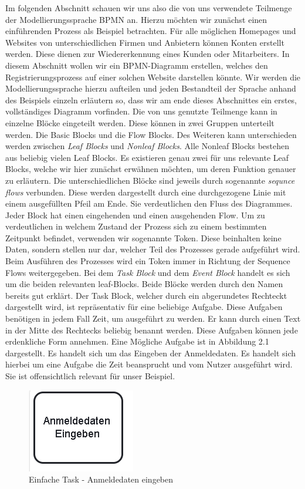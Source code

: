 Im folgenden Abschnitt schauen wir uns also die von uns verwendete Teilmenge der Modellierungssprache BPMN an. Hierzu möchten wir zunächst einen einführenden Prozess als Beispiel betrachten. Für alle möglichen Homepages und Websites von unterschiedlichen Firmen und Anbietern können Konten erstellt werden. Diese dienen zur Wiedererkennung eines Kunden oder Mitarbeiters. In diesem Abschnitt wollen wir ein BPMN-Diagramm erstellen, welches den Registrierungsprozess auf einer solchen Website darstellen könnte. Wir werden die Modellierungssprache hierzu aufteilen und jeden Bestandteil der Sprache anhand des Beispiels einzeln erläutern so, dass wir am ende dieses Abschnittes ein erstes, vollständiges Diagramm vorfinden. 
Die von uns genutzte Teilmenge kann in einzelne Blöcke eingeteilt werden. Diese können in zwei Gruppen unterteilt werden. Die Basic Blocks und die Flow Blocks. Des Weiteren kann unterschieden werden zwischen \emph{Leaf Blocks} und \emph{Nonleaf Blocks}. Alle Nonleaf Blocks bestehen aus beliebig vielen Leaf Blocks. Es existieren genau zwei für uns relevante Leaf Blocks, welche wir hier zunächst erwähnen möchten, um deren Funktion genauer zu erläutern. Die unterschiedlichen Blöcke sind jeweils durch sogenannte \emph{sequnce flows} verbunden. Diese werden dargestellt durch eine durchgezogene Linie mit einem ausgefüllten Pfeil am Ende. Sie verdeutlichen den Fluss des Diagrammes. Jeder Block hat einen eingehenden und einen ausgehenden Flow. Um zu verdeutlichen in welchem Zustand der Prozess sich zu einem bestimmten Zeitpunkt befindet, verwenden wir sogenannte Token. Diese beinhalten keine Daten, sondern stellen nur dar, welcher Teil des Prozesses gerade aufgeführt wird. Beim Ausführen des Prozesses wird ein Token immer in Richtung der Sequence Flows weitergegeben. Bei dem \emph{Task Block} und dem \emph{Event Block} handelt es sich um die beiden relevanten leaf-Blocks. Beide Blöcke werden durch den Namen bereits gut erklärt. Der Task Block, welcher durch ein abgerundetes Rechteckt dargestellt wird, ist repräsentativ für eine beliebige Aufgabe. Diese Aufgaben benötigen in jedem Fall Zeit, um ausgeführt zu werden. Er kann durch einen Text in der Mitte des Rechtecks beliebig benannt werden. Diese Aufgaben können jede erdenkliche Form annehmen. Eine Mögliche Aufgabe ist in Abbildung 2.1 dargestellt. Es handelt sich um das Eingeben der Anmeldedaten. Es handelt sich hierbei um eine Aufgabe die Zeit beansprucht und vom Nutzer ausgeführt wird. Sie ist offensichtlich relevant für unser Beispiel. 

\begin{figure}
\centering
\includegraphics[scale=1.0]{Figures/Beispiel1}
\decoRule
\caption[Einfache Task]{Einfache Task - Anmeldedaten eingeben}
\label{fig:Task}
\end{figure}

